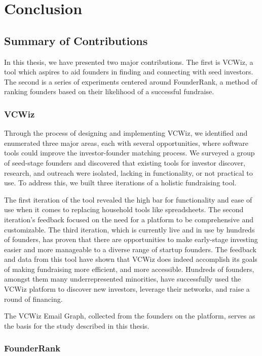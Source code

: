 \chapter{Conclusion}

\section{Summary of Contributions}

In this thesis, we have presented two major contributions. The first is VCWiz, a tool which aspires to aid founders in finding and connecting with seed investors. The second is a series of experiments centered around FounderRank, a method of ranking founders based on their likelihood of a successful fundraise.

\subsection{VCWiz}

Through the process of designing and implementing VCWiz, we identified and enumerated three major areas, each with several opportunities, where software tools could improve the investor-founder matching process. We surveyed a group of seed-stage founders and discovered that existing tools for investor discover, research, and outreach were isolated, lacking in functionality, or not practical to use. To address this, we built three iterations of a holistic fundraising tool.

The first iteration of the tool revealed the high bar for functionality and ease of use when it comes to replacing household tools like spreadsheets. The second iteration's feedback focused on the need for a platform to be comprehensive and customizable. The third iteration, which is currently live and in use by hundreds of founders, has proven that there are opportunities to make early-stage investing easier and more manageable to a diverse range of startup founders. The feedback and data from this tool have shown that VCWiz does indeed accomplish its goals of making fundraising more efficient, and more accessible. Hundreds of founders, amongst them many underrepresented minorities, have successfully used the VCWiz platform to discover new investors, leverage their networks, and raise a round of financing.

The VCWiz Email Graph, collected from the founders on the platform, serves as the basis for the study described in this thesis.

\subsection{FounderRank}

